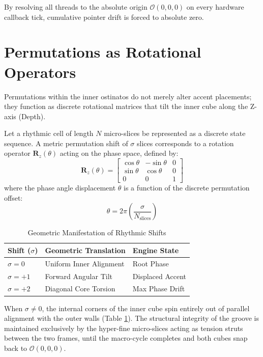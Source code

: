 \documentclass[11pt,twocolumn]{article}
\begin{document}
By resolving all threads to the absolute origin $\mathcal{O}(0,0,0)$ on every hardware callback tick, cumulative pointer drift is forced to absolute zero.

\section{Permutations as Rotational Operators}
Permutations within the inner ostinatos do not merely alter accent placements; they function as discrete rotational matrices that tilt the inner cube along the Z-axis (Depth). 

Let a rhythmic cell of length $N$ micro-slices be represented as a discrete state sequence. A metric permutation shift of $\sigma$ slices corresponds to a rotation operator $\mathbf{R}_z(\theta)$ acting on the phase space, defined by:
\begin{equation}
\mathbf{R}_z(\theta) = \begin{bmatrix} 
\cos\theta & -\sin\theta & 0 \\ 
\sin\theta & \cos\theta & 0 \\ 
0 & 0 & 1 
\end{bmatrix}
\end{equation}
where the phase angle displacement $\theta$ is a function of the discrete permutation offset:
\begin{equation}
\theta = 2\pi \left( \frac{\sigma}{N_{\text{slices}}} \right)
\end{equation}

\begin{table}[h]
\centering
\small
\caption{\small Geometric Manifestation of Rhythmic Shifts}
\label{tab:permutations}
\vspace{2mm}
\begin{tabular}{p{2.2cm} p{2.8cm} p{2.4cm}}
\toprule
\textbf{Shift ($\sigma$)} & \textbf{Geometric Translation} & \textbf{Engine State} \\ 
\midrule
$\sigma = 0$               & Uniform Inner Alignment        & Root Phase \\ \addlinespace[0.5em]
$\sigma = +1$              & Forward Angular Tilt           & Displaced Accent \\ \addlinespace[0.5em]
$\sigma = +2$              & Diagonal Core Torsion          & Max Phase Drift \\ 
\bottomrule
\end{tabular}
\end{table}

When $\sigma \ne 0$, the internal corners of the inner cube spin entirely out of parallel alignment with the outer walls (Table \ref{tab:permutations}). The structural integrity of the groove is maintained exclusively by the hyper-fine micro-slices acting as tension struts between the two frames, until the macro-cycle completes and both cubes snap back to $\mathcal{O}(0,0,0)$.
\end{document}

